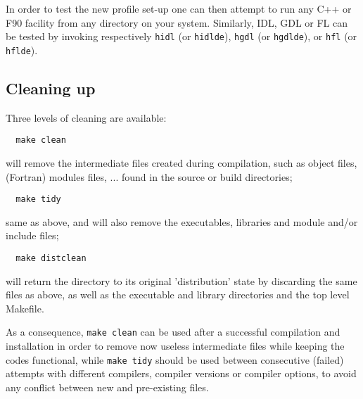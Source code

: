 \documentclass[12pt,twoside]{article}
\begin{document}
\begin{itemize}
\end{itemize}

In order to test the new \healpix profile set-up one can then attempt
to run any C++ or F90 facility from any directory on your system. Similarly,
IDL, GDL or FL can be tested by invoking respectively 
\texttt{hidl} (or \texttt{hidlde}),  \texttt{hgdl} (or \texttt{hgdlde}), or \texttt{hfl} (or \texttt{hflde}).



\subsection{Cleaning up}
Three levels of cleaning are available:
\begin{verbatim}
  make clean
\end{verbatim}
will remove the intermediate files created during compilation, such as object
files, (Fortran) modules files, ... found in the source or build directories;
\begin{verbatim}
  make tidy
\end{verbatim}
same as above, and will also remove the \healpix executables, libraries and module and/or
include files;
\begin{verbatim}
  make distclean
\end{verbatim}
will return the \healpix directory to its original 'distribution' state by discarding the same
files as above, as well as the executable and library directories and the top
level Makefile.

As a consequence, \texttt{make clean} can be used after a successful compilation and installation in order to remove now useless intermediate files while keeping the codes functional, 
while
\texttt{make tidy} should be used between consecutive (failed) attempts with different compilers, compiler versions or compiler options, to avoid any conflict between new and pre-existing files.


\end{document}
